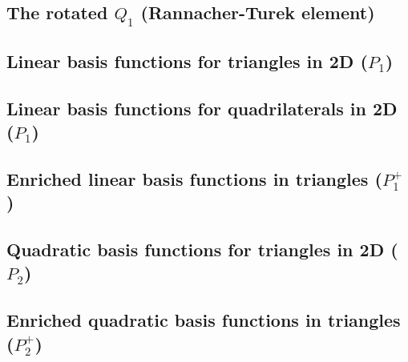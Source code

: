 \subsection{The rotated $Q_1$ (Rannacher-Turek element)} \label{ss:rq1}


\subsection{Linear basis functions for triangles in 2D ($P_1$)}\label{ss:p1}



\subsection{Linear basis functions for quadrilaterals in 2D ($P_1$)}\label{ss:lbfq2D}



\subsection{Enriched linear basis functions in triangles ($P_1^+$)}



\subsection{Quadratic basis functions for triangles in 2D ($P_2$)\label{basis:p2}}


\subsection{Enriched quadratic basis functions in triangles ($P_2^+$)}


